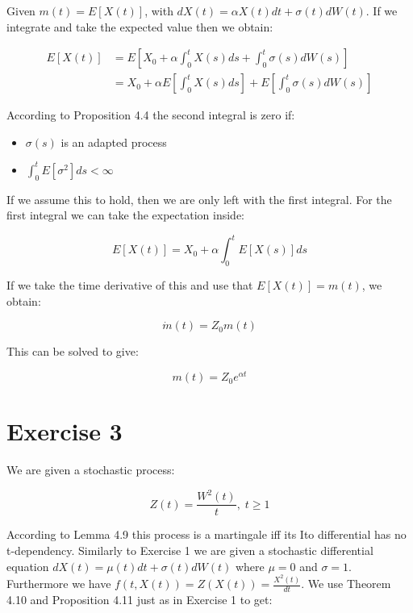 \documentclass[11pt,a4paper,onecolumn]{article}
\begin{document}
Given $m(t) = E[X(t)]$, with $dX(t) = \alpha X(t)dt + \sigma(t)dW(t)$. If we integrate and take the expected value then we obtain:

\begin{align}
  E[X(t)] &= E\left[X_0 + \alpha \int^t_0 X(s)ds + \int^t_0 \sigma(s)dW(s) \right] \\
  &= X_0 + \alpha E\left[\int^t_0 X(s) ds\right] + E\left[\int^t_0 \sigma(s)dW(s)\right]
\end{align}

According to Proposition 4.4 the second integral is zero if:
\begin{itemize}
\item 
  $\sigma(s)$ is an adapted process
\item
  $\int^t_0 E[\sigma^2]ds < \infty$
\end{itemize}

If we assume this to hold, then we are only left with the first integral. For the first integral we can take the expectation inside:

\begin{equation}
  E[X(t)] = X_0 + \alpha \int^t_0 E[X(s)]ds
\end{equation}

If we take the time derivative of this and use that $E[X(t)] = m(t)$, we obtain:

\begin{equation}
  \dot{m}(t) = Z_0 m(t)
\end{equation}

This can be solved to give:

\begin{equation}
  m(t) = Z_0 e^{\alpha t}
\end{equation}


\section{Exercise 3}

We are given a stochastic process:

\begin{equation}
  Z(t) = \frac{W^2(t)}{t}, \; t \geq 1
\end{equation}

According to Lemma 4.9 this process is a martingale iff its Ito differential has no t-dependency. Similarly to Exercise 1 we are given a stochastic differential equation $dX(t) = \mu (t)dt + \sigma (t)dW(t)$ where $\mu = 0$ and $\sigma = 1$. Furthermore we have $f(t,X(t)) = Z(X(t)) = \frac{X^2(t)}{dt}$. We use Theorem 4.10 and Proposition 4.11 just as in Exercise 1 to get: 
\end{document}
